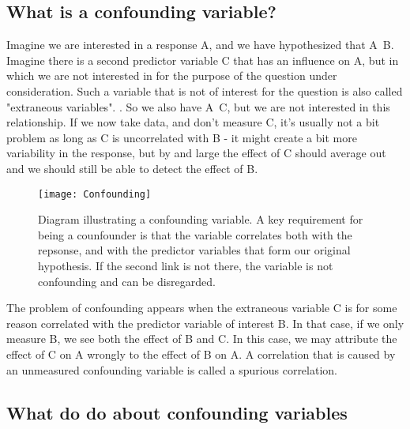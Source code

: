 \documentclass[a4paper,twoside]{tufte-book}\usepackage[]{graphicx}\usepackage[]{color}
\begin{document}
\subsection{What is a confounding variable?}

Imagine we are interested in a response A, and we have hypothesized that A~B. Imagine there is a second predictor variable C that has an influence on A, but in which we are not interested in for the purpose of the question under consideration. Such a variable that is not of interest for the question is also called "extraneous variables". . So we also have A~C, but we are not interested in this relationship. If we now take data, and don't measure C, it's usually not a bit problem as long as C is uncorrelated with B - it might create a bit more variability in the response, but by and large the effect of C should average out and we should still be able to detect the effect of B.

\begin{figure}[]
\begin{center}
\texttt{[image: Confounding]}
\caption{Diagram illustrating a confounding variable. A key requirement for being a counfounder is that the variable correlates both with the repsonse, and with the predictor variables that form our original hypothesis. If the second link is not there, the variable is not confounding and can be disregarded.}
\label{fig: Confounding}
\end{center}
\end{figure}

The problem of confounding appears when the extraneous variable C is for some reason correlated with the predictor variable of interest B.  In that case, if we only measure B, we see both the effect of B and C. In this case, we may attribute the effect of C on A wrongly to the effect of B on A.  A correlation that is caused by an unmeasured confounding variable is called a spurious correlation.  

\subsection{What do do about confounding variables}
\end{document}
